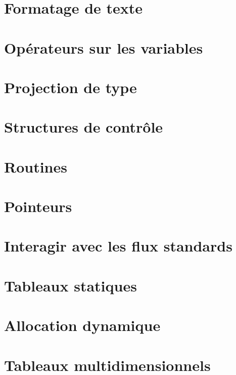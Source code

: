 \documentclass{minitelreport}
\begin{document}
\begin{refsection}
		\section{Formatage de texte}
			\label{sec:formatage_du_texte}
			
		\section{Opérateurs sur les variables}
			\label{sec:operateurs_variables}
			
		\section{Projection de type}
			\label{sec:projection_type}
			
		\section{Structures de contrôle}
			\label{sec:structures_controle}
			
		\section{Routines}
			\label{sec:routines}
			
		\section{Pointeurs}
			\label{sec:pointeurs}
			
		\section{Interagir avec les flux standards}
			\label{sec:flux_standards}
			
		\section{Tableaux statiques}
			\label{sec:tableaux_statiques}
			
		\section{Allocation dynamique}
			\label{sec:allocation_dynamique}
			
		\section{Tableaux multidimensionnels}
			\label{sec:tableaux_multidimensionnels}
			

\end{refsection}
\end{document}
